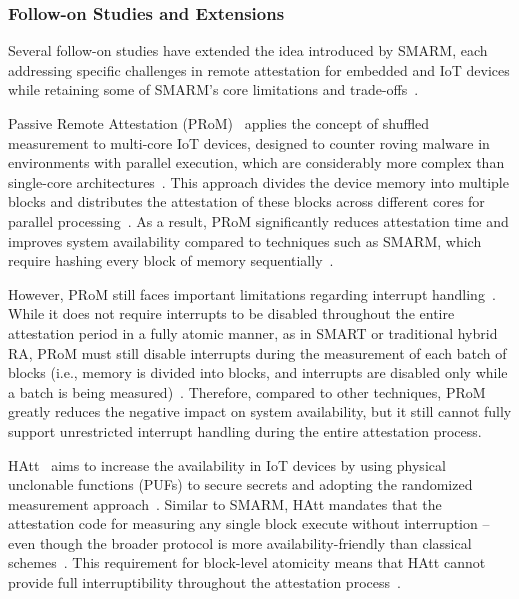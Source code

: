 \documentclass[a4paper,10pt]{article}
\begin{document}
\subsubsection{Follow-on Studies and Extensions}
Several follow-on studies have extended the idea introduced by SMARM, each addressing specific challenges in remote attestation for embedded and IoT devices while retaining some of SMARM's core limitations and trade-offs~\cite{aman2021prom,aman2018hatt}.



Passive Remote Attestation (PRoM)~\cite{aman2021prom} applies the concept of shuffled measurement to multi-core IoT devices, designed to counter roving malware in environments with parallel execution, which are considerably more complex than single-core architectures~\cite{aman2021prom}. This approach divides the device memory into multiple blocks and distributes the attestation of these blocks across different cores for parallel processing~\cite{aman2021prom}. As a result, PRoM significantly reduces attestation time and improves system availability compared to techniques such as SMARM, which require hashing every block of memory sequentially~\cite{aman2021prom}.

However, PRoM still faces important limitations regarding interrupt handling~\cite{aman2021prom}. While it does not require interrupts to be disabled throughout the entire attestation period in a fully atomic manner, as in SMART or traditional hybrid RA, PRoM must still disable interrupts during the measurement of each batch of blocks (i.e., memory is divided into blocks, and interrupts are disabled only while a batch is being measured)~\cite{aman2021prom}. Therefore, compared to other techniques, PRoM greatly reduces the negative impact on system availability, but it still cannot fully support unrestricted interrupt handling during the entire attestation process.

HAtt~\cite{aman2018hatt} aims to increase the availability in IoT devices by using physical unclonable functions (PUFs) to secure secrets and adopting the randomized measurement approach~\cite{aman2018hatt}. Similar to SMARM, HAtt mandates that the attestation code for measuring any single block execute without interruption -- even though the broader protocol is more availability-friendly than classical schemes~\cite{aman2018hatt}. This requirement for block-level atomicity means that HAtt cannot provide full interruptibility throughout the attestation process~\cite{aman2018hatt}.
\end{document}
